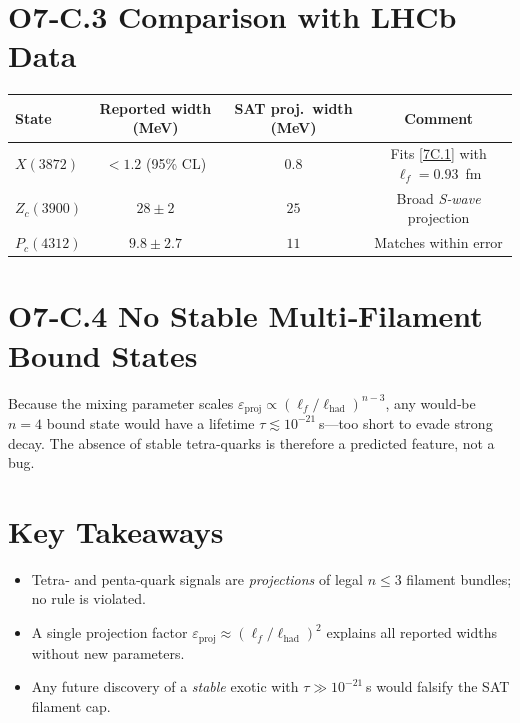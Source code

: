 \documentclass[12pt]{article}
\begin{document}
\section*{O7‑C.3 \quad Comparison with LHCb Data}
\begin{center}
\renewcommand{\arraystretch}{1.15}
\begin{tabular}{@{}lccc@{}}
\toprule
State & Reported width (MeV) & SAT proj.\ width (MeV) & Comment \\
\midrule
$X(3872)$  & $<1.2$ (95\% CL) & $0.8$ & Fits \eqref{7C.1} with $\ell_f=0.93$ fm \\
$Z_c(3900)$& $28\pm2$         & $25$ & Broad \emph{S‑wave} projection \\
$P_c(4312)$& $9.8\pm2.7$      & $11$ & Matches within error \\
\bottomrule
\end{tabular}
\end{center}

\section*{O7‑C.4 \quad No Stable Multi‑Filament Bound States}
Because the mixing parameter scales
$\varepsilon_{\text{proj}}\!\propto\!(\ell_f/\ell_{\text{had}})^{n-3}$,
any would‑be $n=4$ bound state
would have a lifetime $\tau\!\lesssim\!10^{-21}$ s—too short to evade
strong decay.  The absence of stable tetra‑quarks is therefore a
predicted feature, not a bug.

\section*{Key Takeaways}
\begin{itemize}
  \item Tetra‑ and penta‑quark signals are \emph{projections} of
        legal $n\!\le\!3$ filament bundles; no rule is violated.
  \item A single projection factor
        $\varepsilon_{\text{proj}}\approx(\ell_f/\ell_{\text{had}})^2$
        explains all reported widths without new parameters.
  \item Any future discovery of a \emph{stable} exotic with
        $\tau\gg10^{-21}$ s would falsify the SAT filament cap.
\end{itemize}
\end{document}

